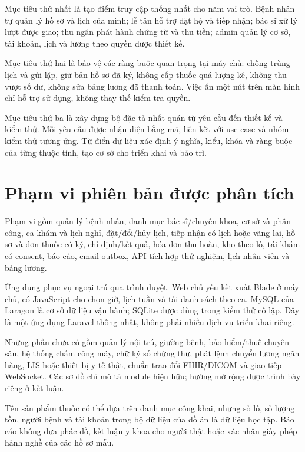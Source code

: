 Mục tiêu thứ nhất là tạo điểm truy cập thống nhất cho năm vai trò.\allowbreak{} Bệnh nhân tự quản lý hồ sơ và lịch của mình; lễ tân hỗ trợ đặt hộ và tiếp nhận; bác sĩ xử lý lượt được giao; thu ngân phát hành chứng từ và thu tiền; admin quản lý cơ sở, tài khoản, lịch và lương theo quyền được thiết kế.\allowbreak{}

Mục tiêu thứ hai là bảo vệ các ràng buộc quan trọng tại máy chủ:\allowbreak{} chống trùng lịch và gửi lặp, giữ bản hồ sơ đã ký, không cấp thuốc quá lượng kê, không thu vượt số dư, không sửa bảng lương đã thanh toán.\allowbreak{} Việc ẩn một nút trên màn hình chỉ hỗ trợ sử dụng, không thay thế kiểm tra quyền.\allowbreak{}

Mục tiêu thứ ba là xây dựng bộ đặc tả nhất quán từ yêu cầu đến thiết kế và kiểm thử.\allowbreak{} Mỗi yêu cầu được nhận diện bằng mã, liên kết với use case và nhóm kiểm thử tương ứng.\allowbreak{} Từ điển dữ liệu xác định ý nghĩa, kiểu, khóa và ràng buộc của từng thuộc tính, tạo cơ sở cho triển khai và bảo trì.\allowbreak{}


\section{Phạm vi phiên bản được phân tích}
Phạm vi gồm quản lý bệnh nhân, danh mục bác sĩ/\allowbreak{}chuyên khoa, cơ sở và phân công, ca khám và lịch nghỉ, đặt/\allowbreak{}đổi/\allowbreak{}hủy lịch, tiếp nhận có lịch hoặc vãng lai, hồ sơ và đơn thuốc có ký, chỉ định/\allowbreak{}kết quả, hóa đơn-thu-hoàn, kho theo lô, tái khám có consent, báo cáo, email outbox, API tích hợp thử nghiệm, lịch nhân viên và bảng lương.\allowbreak{}

Ứng dụng phục vụ ngoại trú qua trình duyệt.\allowbreak{} Web chủ yếu kết xuất Blade ở máy chủ, có Java\allowbreak{}Script cho chọn giờ, lịch tuần và tải danh sách theo ca.\allowbreak{} My\allowbreak{}SQL của Laragon là cơ sở dữ liệu vận hành; SQLite được dùng trong kiểm thử cô lập.\allowbreak{} Đây là một ứng dụng Laravel thống nhất, không phải nhiều dịch vụ triển khai riêng.\allowbreak{}

Những phần chưa có gồm quản lý nội trú, giường bệnh, bảo hiểm/\allowbreak{}thuế chuyên sâu, hệ thống chấm công máy, chữ ký số chứng thư, phát lệnh chuyển lương ngân hàng, LIS hoặc thiết bị y tế thật, chuẩn trao đổi FHIR/\allowbreak{}DICOM và giao tiếp Web\allowbreak{}Socket.\allowbreak{} Các sơ đồ chỉ mô tả module hiện hữu; hướng mở rộng được trình bày riêng ở kết luận.\allowbreak{}

Tên sản phẩm thuốc có thể dựa trên danh mục công khai, nhưng số lô, số lượng tồn, người bệnh và tài khoản trong bộ dữ liệu của đồ án là dữ liệu học tập.\allowbreak{} Báo cáo không đưa phác đồ, kết luận y khoa cho người thật hoặc xác nhận giấy phép hành nghề của các hồ sơ mẫu.\allowbreak{}


